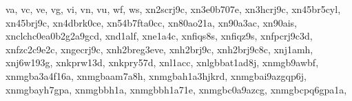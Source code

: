 \documentclass[letterpaper,10pt,english]{sphinxmanual}
\begin{document}
\begin{fulllineitems}
\begin{fulllineitems}
\textquotesingle{}va\textquotesingle{}, \textquotesingle{}vc\textquotesingle{}, \textquotesingle{}ve\textquotesingle{}, \textquotesingle{}vg\textquotesingle{}, \textquotesingle{}vi\textquotesingle{}, \textquotesingle{}vn\textquotesingle{}, \textquotesingle{}vu\textquotesingle{}, \textquotesingle{}wf\textquotesingle{}, \textquotesingle{}ws\textquotesingle{}, \textquotesingle{}xn\sphinxhyphen{}\sphinxhyphen{}2scrj9c\textquotesingle{}, \textquotesingle{}xn\sphinxhyphen{}\sphinxhyphen{}3e0b707e\textquotesingle{}, \textquotesingle{}xn\sphinxhyphen{}\sphinxhyphen{}3hcrj9c\textquotesingle{}, \textquotesingle{}xn\sphinxhyphen{}\sphinxhyphen{}45br5cyl\textquotesingle{}, \textquotesingle{}xn\sphinxhyphen{}\sphinxhyphen{}45brj9c\textquotesingle{}, \textquotesingle{}xn\sphinxhyphen{}\sphinxhyphen{}4dbrk0ce\textquotesingle{}, \textquotesingle{}xn\sphinxhyphen{}\sphinxhyphen{}54b7fta0cc\textquotesingle{}, \textquotesingle{}xn\sphinxhyphen{}\sphinxhyphen{}80ao21a\textquotesingle{}, \textquotesingle{}xn\sphinxhyphen{}\sphinxhyphen{}90a3ac\textquotesingle{}, \textquotesingle{}xn\sphinxhyphen{}\sphinxhyphen{}90ais\textquotesingle{}, \textquotesingle{}xn\sphinxhyphen{}\sphinxhyphen{}clchc0ea0b2g2a9gcd\textquotesingle{}, \textquotesingle{}xn\sphinxhyphen{}\sphinxhyphen{}d1alf\textquotesingle{}, \textquotesingle{}xn\sphinxhyphen{}\sphinxhyphen{}e1a4c\textquotesingle{}, \textquotesingle{}xn\sphinxhyphen{}\sphinxhyphen{}fiqs8s\textquotesingle{}, \textquotesingle{}xn\sphinxhyphen{}\sphinxhyphen{}fiqz9s\textquotesingle{}, \textquotesingle{}xn\sphinxhyphen{}\sphinxhyphen{}fpcrj9c3d\textquotesingle{}, \textquotesingle{}xn\sphinxhyphen{}\sphinxhyphen{}fzc2c9e2c\textquotesingle{}, \textquotesingle{}xn\sphinxhyphen{}\sphinxhyphen{}gecrj9c\textquotesingle{}, \textquotesingle{}xn\sphinxhyphen{}\sphinxhyphen{}h2breg3eve\textquotesingle{}, \textquotesingle{}xn\sphinxhyphen{}\sphinxhyphen{}h2brj9c\textquotesingle{}, \textquotesingle{}xn\sphinxhyphen{}\sphinxhyphen{}h2brj9c8c\textquotesingle{}, \textquotesingle{}xn\sphinxhyphen{}\sphinxhyphen{}j1amh\textquotesingle{}, \textquotesingle{}xn\sphinxhyphen{}\sphinxhyphen{}j6w193g\textquotesingle{}, \textquotesingle{}xn\sphinxhyphen{}\sphinxhyphen{}kprw13d\textquotesingle{}, \textquotesingle{}xn\sphinxhyphen{}\sphinxhyphen{}kpry57d\textquotesingle{}, \textquotesingle{}xn\sphinxhyphen{}\sphinxhyphen{}l1acc\textquotesingle{}, \textquotesingle{}xn\sphinxhyphen{}\sphinxhyphen{}lgbbat1ad8j\textquotesingle{}, \textquotesingle{}xn\sphinxhyphen{}\sphinxhyphen{}mgb9awbf\textquotesingle{}, \textquotesingle{}xn\sphinxhyphen{}\sphinxhyphen{}mgba3a4f16a\textquotesingle{}, \textquotesingle{}xn\sphinxhyphen{}\sphinxhyphen{}mgbaam7a8h\textquotesingle{}, \textquotesingle{}xn\sphinxhyphen{}\sphinxhyphen{}mgbah1a3hjkrd\textquotesingle{}, \textquotesingle{}xn\sphinxhyphen{}\sphinxhyphen{}mgbai9azgqp6j\textquotesingle{}, \textquotesingle{}xn\sphinxhyphen{}\sphinxhyphen{}mgbayh7gpa\textquotesingle{}, \textquotesingle{}xn\sphinxhyphen{}\sphinxhyphen{}mgbbh1a\textquotesingle{}, \textquotesingle{}xn\sphinxhyphen{}\sphinxhyphen{}mgbbh1a71e\textquotesingle{}, \textquotesingle{}xn\sphinxhyphen{}\sphinxhyphen{}mgbc0a9azcg\textquotesingle{}, \textquotesingle{}xn\sphinxhyphen{}\sphinxhyphen{}mgbcpq6gpa1a\textquotesingle{}, 
\end{fulllineitems}
\end{fulllineitems}
\end{document}

